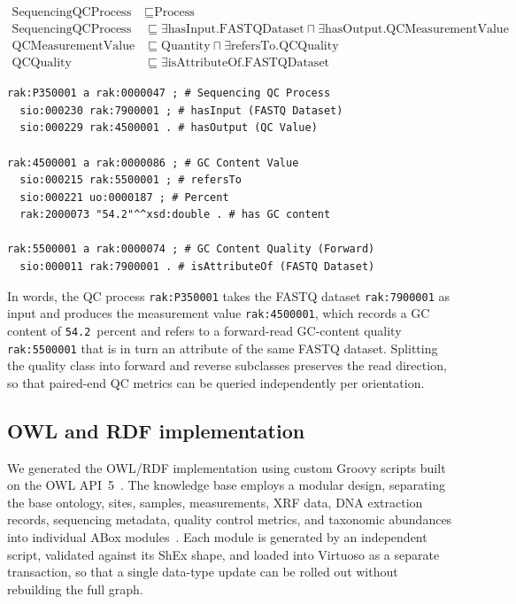 \documentclass[11pt,a4paper]{article}
\begin{document}
\begin{align}
    \label{eq:qc}
    \text{SequencingQCProcess} & \sqsubseteq \text{Process} \\
    \text{SequencingQCProcess} & \sqsubseteq \exists
        \text{hasInput}.\text{FASTQDataset} \sqcap \exists
        \text{hasOutput}.\text{QCMeasurementValue} \\
    \text{QCMeasurementValue} & \sqsubseteq \text{Quantity} \sqcap
        \exists \text{refersTo}.\text{QCQuality} \\
    \text{QCQuality} & \sqsubseteq \exists
        \text{isAttributeOf}.\text{FASTQDataset}
\end{align}

\begin{lstlisting}[caption={Turtle representation of a sequencing QC
  measurement (forward-read GC content).},
  label={lst:ttl_qc}, basicstyle=\ttfamily\scriptsize, frame=single]
rak:P350001 a rak:0000047 ; # Sequencing QC Process
  sio:000230 rak:7900001 ; # hasInput (FASTQ Dataset)
  sio:000229 rak:4500001 . # hasOutput (QC Value)

rak:4500001 a rak:0000086 ; # GC Content Value
  sio:000215 rak:5500001 ; # refersTo
  sio:000221 uo:0000187 ; # Percent
  rak:2000073 "54.2"^^xsd:double . # has GC content

rak:5500001 a rak:0000074 ; # GC Content Quality (Forward)
  sio:000011 rak:7900001 . # isAttributeOf (FASTQ Dataset)
\end{lstlisting}

In words, the QC process \texttt{rak:P350001} takes the FASTQ dataset
\texttt{rak:7900001} as input and produces the measurement value
\texttt{rak:4500001}, which records a GC content of
\texttt{54.2}~percent and refers to a forward-read GC-content quality
\texttt{rak:5500001} that is in turn an attribute of the same FASTQ
dataset. Splitting the quality class into forward and reverse
subclasses preserves the read direction, so that paired-end QC
metrics can be queried independently per orientation.

\subsection{OWL and RDF implementation}\label{subsec:owl_rdf}

We generated the OWL/RDF implementation using custom Groovy scripts
built on the OWL API~5~\cite{owlapi}. The knowledge base employs a
modular design, separating the base ontology, sites, samples,
measurements, XRF data, DNA extraction records, sequencing metadata,
quality control metrics, and taxonomic abundances into individual
ABox modules~\cite{hitzler_modularity}. Each module is generated by
an independent script, validated against its ShEx shape, and loaded
into Virtuoso as a separate transaction, so that a single data-type
update can be rolled out without rebuilding the full graph.
\end{document}
